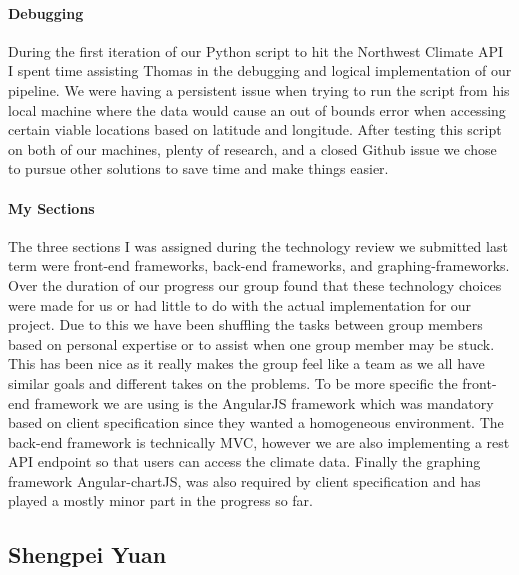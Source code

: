 \documentclass[onecolumn, draftclsnofoot,10pt, compsoc]{article}
\begin{document}
        \paragraph{Debugging}
        During the first iteration of our Python script to hit the Northwest Climate API I spent time assisting Thomas in the debugging and logical implementation of our pipeline. We were having a persistent issue when trying to run the script from his local machine where the data would cause an out of bounds error when accessing certain viable locations based on latitude and longitude. After testing this script on both of our machines, plenty of research, and a closed Github issue we chose to pursue other solutions to save time and make things easier.
        \paragraph{My Sections} 
        The three sections I was assigned during the technology review we submitted last term were front-end frameworks, back-end frameworks, and graphing-frameworks. Over the duration of our progress our group found that these technology choices were made for us or had little to do with the actual implementation for our project. Due to this we have been shuffling the tasks between group members based on personal expertise or to assist when one group member may be stuck. This has been nice as it really makes the group feel like a team as we all have similar goals and different takes on the problems. To be more specific the front-end framework we are using is the AngularJS framework which was mandatory based on client specification since they wanted a homogeneous environment. The back-end framework is technically MVC, however we are also implementing a rest API endpoint so that users can access the climate data. Finally the graphing framework Angular-chartJS, was also required by client specification and has played a mostly minor part in the progress so far.


\subsection{Shengpei Yuan}
\end{document}
